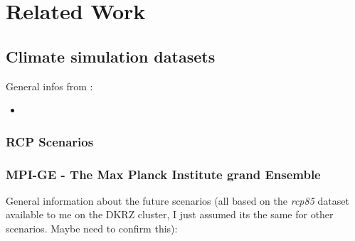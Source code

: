 \chapter{Related Work}

\section{Climate simulation datasets}

General infos from \cite{maher_max_2019}:

\begin{itemize}
  \item 
	
\end{itemize}

\subsection{RCP Scenarios}

% 

\subsection{MPI-GE - The Max Planck Institute grand Ensemble}

General information about the future scenarios (all based on the \textit{rcp85} dataset available to me on the DKRZ cluster, I just assumed its the same for other scenarios. Maybe need to confirm this):

